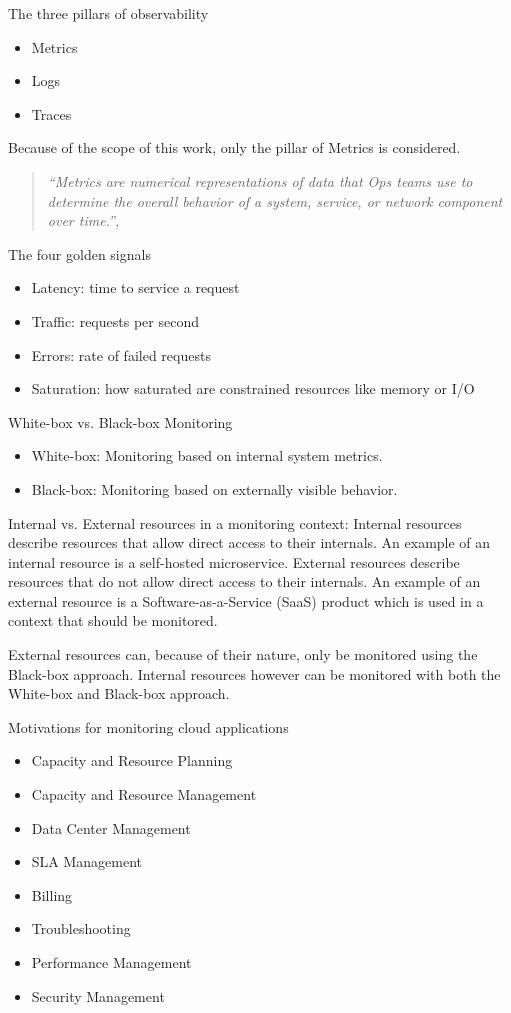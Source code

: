 The three pillars of observability \cite{9837035}
\begin{itemize}
    \item Metrics
    \item Logs
    \item Traces
\end{itemize}

Because of the scope of this work, only the pillar of Metrics is considered.

\begin{quote}
\textit{``Metrics are numerical representations of data that Ops teams use to determine the overall behavior of a system, service, or network component over time.'', \cite{9837035}}
\end{quote}

The four golden signals \cite{Beyer2016-xi}
\begin{itemize}
    \item Latency: time to service a request
    \item Traffic: requests per second
    \item Errors: rate of failed requests
    \item Saturation: how saturated are constrained resources like memory or I/O
\end{itemize}

White-box vs. Black-box Monitoring \cite{Beyer2016-xi}
\begin{itemize}
    \item White-box: Monitoring based on internal system metrics.
    \item Black-box: Monitoring based on externally visible behavior.
\end{itemize}

Internal vs. External resources in a monitoring context:
Internal resources describe resources that allow direct access to their internals.
An example of an internal resource is a self-hosted microservice.
External resources describe resources that do not allow direct access to their internals.
An example of an external resource is a Software-as-a-Service (SaaS) product which is used in a context that should be monitored.

External resources can, because of their nature, only be monitored using the Black-box approach.
Internal resources however can be monitored with both the White-box and Black-box approach.

Motivations for monitoring cloud applications \cite{6483656}
\begin{itemize}
    \item Capacity and Resource Planning
    \item Capacity and Resource Management
    \item Data Center Management
    \item SLA Management
    \item Billing
    \item Troubleshooting
    \item Performance Management
    \item Security Management
\end{itemize}

